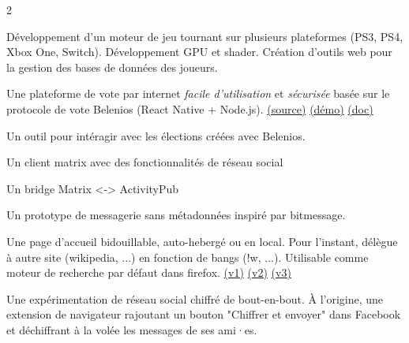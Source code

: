 \documentclass[10pt,a4paper,withhyper]{altacv}
\begin{document}
\begin{paracol}{2}
\divider

Développement d'un moteur de jeu tournant sur plusieurs plateformes (PS3, PS4, Xbox One, Switch). Développement GPU et shader. Création d’outils web pour la gestion des bases de données des joueurs.

\newpage



Une plateforme de vote par internet \textit{facile d'utilisation} et \textit{sécurisée} basée sur le protocole de vote Belenios (React Native + Node.js).
\href{https://github.com/mjal/scrutin}{(source)}
\href{https://scrutin.app/}{(démo)}
\href{https://docs.scrutin.app/}{(doc)}

\divider


Un outil pour intéragir avec les élections créées avec Belenios.

\divider


Un client matrix avec des fonctionnalités de réseau social

\divider


Un bridge Matrix <-> ActivityPub

\divider


Un prototype de messagerie sans métadonnées inspiré par bitmessage.

\divider


Une page d'accueil bidouillable, auto-hebergé ou en local. Pour l'instant, délègue à autre site (wikipedia, ...) en fonction de bangs (!w, ...). Utilisable comme moteur de recherche par défaut dans firefox.
\href{https://mjal.github.io/ami/}{(v1)}
\href{https://mjal.github.io/ami3d/}{(v2)}
\href{https://mjal.github.io/ami3/}{(v3)}

\divider


Une expérimentation de réseau social chiffré de bout-en-bout. À l'origine, une extension de navigateur rajoutant un bouton "Chiffrer et envoyer" dans Facebook et déchiffrant à la volée les messages de ses ami·es.


\end{paracol}
\end{document}
